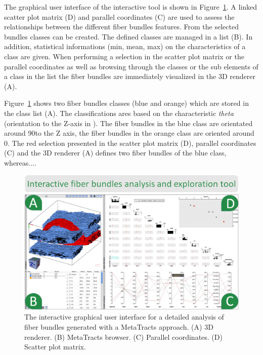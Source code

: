 The graphical user interface of the interactive tool is shown in Figure~\ref{fig:interactive_tool_gui}. A linked scatter plot matrix (D) and parallel coordinates (C) are used to assess the relationships between the different fiber bundles features. From the selected bundles classes can be created. The defined classes are managed in a list (B). In addition, statistical informations (min, mean, max) on the characteristics of a class are given. When performing a selection in the scatter plot matrix or the parallel coordinates as well as browsing through the classes or the sub elements of a class in the list the fiber bundles are immediately visualized in the 3D renderer (A).

Figure~\ref{fig:interactive_tool_gui} shows two fiber bundles classes (blue and orange) which are stored in the class list (A). The classifications ares based on the characteristic \textit{theta} (orientation to the Z-axis in \textdegree). The fiber bundles in the blue class are orientated around 90\textdegree to the Z axis, the fiber bundles in the orange class are oriented around 0\textdegree. The red selection presented in the scatter plot matrix (D), parallel coordinates (C) and the 3D renderer (A) defines two fiber bundles of the blue class, whereas....    

\begin{figure}[htb]
	\centering
	\includegraphics[width=\linewidth]{images/FiberScout_GUI.eps}
	\caption{The interactive graphical user interface for a detailed analysis of fiber bundles generated with a MetaTracts approach. (A) 3D renderer. (B) MetaTracts browser. (C) Parallel coordinates. (D) Scatter plot matrix. }
	\label{fig:interactive_tool_gui}
\end{figure}


